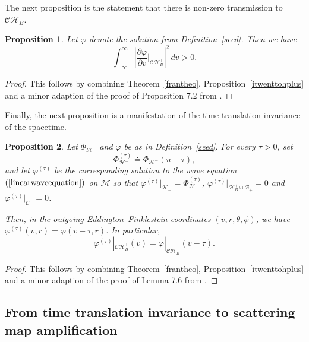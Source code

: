 \documentclass[A4,10pt]{article}
\newtheorem{proposition}{Proposition}[subsection]
\begin{document}
The next proposition is the statement that there is non-zero transmission to $\mathcal{CH}^+_B$.
\begin{proposition}\label{ittransmitsyay} Let $\varphi$ denote the solution from Definition~\ref{seed}. Then we have 
\[\int_{-\infty}^{\infty}\left|\frac{\partial \varphi}{\partial v}|_{\mathcal{CH}^+_B}\right|^2\, dv  > 0.\]
\end{proposition}
\begin{proof}This follows by combining Theorem~\ref{frantheo}, Proposition~\ref{itwenttohplus} and a minor adaption of the proof of Proposition 7.2 from \cite{DafShlap}.

\end{proof}

Finally, the next proposition is a manifestation of the time translation invariance of the spacetime.
\begin{proposition}\label{ittimetranslatesyay}Let $\Phi_{\mathcal{H}^-}$ and $\varphi$ be as in Definition~\ref{seed}.  For every $\tau > 0$, set 
\[\Phi^{(\tau)}_{\mathcal{H}^-} \doteq \Phi_{\mathcal{H}^-}\left(u-\tau\right),\] 
and let $\varphi^{(\tau)}$ be the corresponding solution to the wave equation
$(\ref{linearwaveequation})$ on $\mathcal{M}$ so that $\varphi^{(\tau)}|_{\mathcal{H}_-} = \Phi^{(\tau)}_{\mathcal{H}^-}$, $\varphi^{(\tau)}|_{\mathcal{H}^+_B\cup\mathcal{B}_+} = 0$ and $\varphi^{(\tau)}|_{\mathcal{C}^-} = 0$. 

Then, in the outgoing Eddington--Finklestein coordinates $(v,r,\theta,\phi)$, we have  $\varphi^{(\tau)}\left(v,r\right) = \varphi\left(v-\tau,r\right)$. In particular,
\[\varphi^{(\tau)}|_{\mathcal{CH}^+_B}\left(v\right) = \varphi|_{\mathcal{CH}^+_B}\left(v-\tau\right).\]

\end{proposition}
\begin{proof}This follows by combining Theorem~\ref{frantheo}, Proposition~\ref{itwenttohplus} and a minor adaption of the proof of Lemma 7.6 from \cite{DafShlap}.
\end{proof}

\subsection{From time translation invariance to scattering map amplification}\label{thekey}
\end{document}
